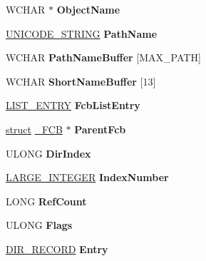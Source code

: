 \begin{DoxyCompactItemize}
W\+C\+H\+AR $\ast$ {\bfseries Object\+Name}
\item 
\mbox{\label{struct___f_c_b_ad7c407a99c355436dddd552a80b79c1d}} 
\hyperlink{struct___u_n_i_c_o_d_e___s_t_r_i_n_g}{U\+N\+I\+C\+O\+D\+E\+\_\+\+S\+T\+R\+I\+NG} {\bfseries Path\+Name}
\item 
\mbox{\label{struct___f_c_b_a6fe1a4d0793f61060cacc5bb3515fa15}} 
W\+C\+H\+AR {\bfseries Path\+Name\+Buffer} \mbox{[}M\+A\+X\+\_\+\+P\+A\+TH\mbox{]}
\item 
\mbox{\label{struct___f_c_b_a54e8602d037325052e08d89389180a6d}} 
W\+C\+H\+AR {\bfseries Short\+Name\+Buffer} \mbox{[}13\mbox{]}
\item 
\mbox{\label{struct___f_c_b_a3232b5ab326bb1647d18111d45c9957a}} 
\hyperlink{struct___l_i_s_t___e_n_t_r_y}{L\+I\+S\+T\+\_\+\+E\+N\+T\+RY} {\bfseries Fcb\+List\+Entry}
\item 
\mbox{\label{struct___f_c_b_a0abc443b607fc4e5520a554e5e1a9af6}} 
\hyperlink{interfacestruct}{struct} \hyperlink{struct___f_c_b}{\+\_\+\+F\+CB} $\ast$ {\bfseries Parent\+Fcb}
\item 
\mbox{\label{struct___f_c_b_a81aa974d9dfdfd7a19f43f9de9868c8e}} 
U\+L\+O\+NG {\bfseries Dir\+Index}
\item 
\mbox{\label{struct___f_c_b_a7ca737817c19bbc826d06ad3dbe67ddb}} 
\hyperlink{union___l_a_r_g_e___i_n_t_e_g_e_r}{L\+A\+R\+G\+E\+\_\+\+I\+N\+T\+E\+G\+ER} {\bfseries Index\+Number}
\item 
\mbox{\label{struct___f_c_b_a3ab585b9732de73772dbb0249eba95ec}} 
L\+O\+NG {\bfseries Ref\+Count}
\item 
\mbox{\label{struct___f_c_b_a1f14bebd8a6246b84a784c3f4930e0f4}} 
U\+L\+O\+NG {\bfseries Flags}
\item 
\mbox{\label{struct___f_c_b_ae3aa7b81c5a4fba076a53075c3236e7a}} 
\hyperlink{struct___d_i_r___r_e_c_o_r_d}{D\+I\+R\+\_\+\+R\+E\+C\+O\+RD} {\bfseries Entry}
\item 

\end{DoxyCompactItemize}
